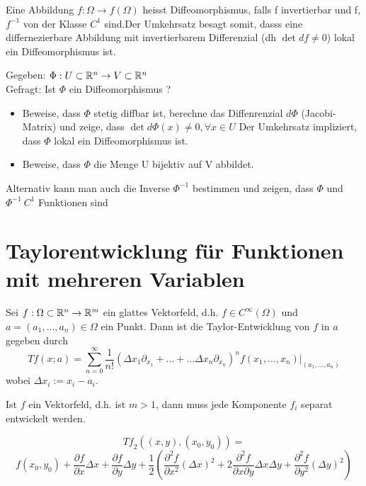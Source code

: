 \begin{remark}
    Eine Abbildung $f: \Omega \to f(\Omega)$ heisst Diffeomorphismus, falls f invertierbar und f, $f^{-1}$ von der Klasse $C^1$ sind.Der Umkehrsatz besagt somit, dasss eine differnezierbare Abbildung mit invertierbarem Differenzial (dh $\det df \neq 0$) lokal ein Diffeomorphismus ist.
\end{remark}

\begin{concept}
    Gegeben: $\Phi: U \subset \mathbb{R}^n \to V \subset \mathbb{R}^n$ \\
    Gefragt: Ist $\Phi$ ein Diffeomorphismus ? \\
    \begin{itemize}
        \item Beweise, dass $\Phi$ stetig diffbar ist, berechne das Diffenrenzial $d\Phi$ (Jacobi-Matrix) und zeige, dass $\det d\Phi(x) \neq 0, \forall x \in U$
        Der Umkehrsatz impliziert, dass $\Phi$ lokal ein Diffeomorphismus ist.
        \item Beweise, dass $\Phi$ die Menge U bijektiv auf V abbildet.
    \end{itemize}
    Alternativ kann man auch die Inverse $\Phi^{-1}$ bestimmen und zeigen, dass $\Phi$ und $\Phi^{-1} \: C^1$ Funktionen sind
\end{concept}

\section{Taylorentwicklung für Funktionen mit mehreren Variablen}

\begin{definition}
    Sei $f: \Omega \subset\mathbb{R}^n \to \mathbb{R}^m$ ein glattes Vektorfeld, d.h. $f \in C^\infty(\Omega)$ und $a = (a_1, \dots, a_n) \in \Omega$ ein Punkt. Dann ist die Taylor-Entwicklung von $f$ in $a$ gegeben durch
    $$ \mathit{Tf} (x; a) = \sum_{n=0}^\infty \frac{1}{n!} \left( \Delta x_1 \partial_{x_1} + \dots + \dots \Delta x_n \partial_{x_n} \right)^n f(x_1, \dots, x_n) \bigg|_{(a_1, \dots, a_n)}$$
    wobei $\Delta x_i := x_i - a_i$.
\end{definition}

\begin{remark}
    Ist $f$ ein Vektorfeld, d.h. ist $m > 1$, dann muss jede Komponente $f_i$ separat entwickelt werden.
\end{remark}

\begin{concept}
    $$ \mathit{Tf}_2((x,y), (x_0,y_0)) =$$ $$f(x_0, y_0) + \frac{\partial f}{\partial x} \Delta x + \frac{\partial f}{\partial y} \Delta y + \frac{1}{2} \left( \frac{\partial^2 f}{\partial x^2} (\Delta x)^2 + 2 \frac{\partial^2 f}{\partial x \partial y} \Delta x \Delta y + \frac{\partial^2 f}{\partial y^2} (\Delta y)^2 \right)$$
\end{concept}

